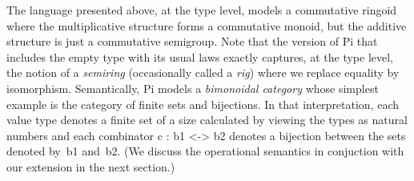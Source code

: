 \documentclass{llncs}
\newcommand{\jacques}[1]{\textsc{Jacques says:} #1}
\newcommand{\roshan}[1]{}
\begin{document}
The language presented above, at the type level, models a commutative ringoid
where the multiplicative structure forms a commutative monoid, but the
additive structure is just a commutative semigroup.  Note that the version of
{{Pi}} that includes the empty type with its usual laws exactly captures, at
the type level, the notion of a \emph{semiring} (occasionally called a
\emph{rig}) where we replace equality by isomorphism.  Semantically, {{Pi}}
models a \emph{bimonoidal category} whose simplest example is the category of
finite sets and bijections. In that interpretation, each value type denotes a
finite set of a size calculated by viewing the types as natural numbers and
each combinator {{c : b1 <-> b2}} denotes a bijection between the sets
denoted by~{{b1}} and~{{b2}}. (We discuss the operational semantics in
conjuction with our extension in the next section.) 

\roshan{Suggestion : This para is a good one to delete if we run out
  of space. This is largely general knowledge about universal algebra
  and maybe one useful remark about the categorical structure. However
  we have a whole paper about the categorical structure of Pi at RC
  itself. My point is this sort of this can be a remark inserted at
  other places in passing and it doesn't deserve a para on its own. It
  teaches the reader nothing new about Pi. }


\end{document}
